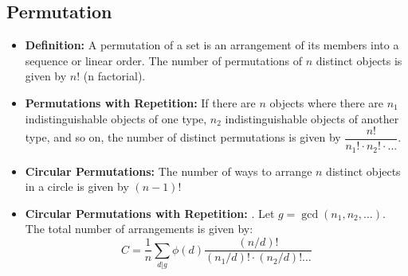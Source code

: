 \subsection{Permutation}

\begin{itemize}
    \item \textbf{Definition: } A permutation of a set is an arrangement of its members into a sequence or linear order. The number of permutations of $n$ distinct objects is given by $n!$ (n factorial).
    \item \textbf{Permutations with Repetition: } If there are $n$ objects where there are $n_1$ indistinguishable objects of one type, $n_2$ indistinguishable objects of another type, and so on, the number of distinct permutations is given by $\dfrac{n!}{n_1! \cdot n_2! \cdot ...}$.
    \item \textbf{Circular Permutations: } The number of ways to arrange $n$ distinct objects in a circle is given by $(n-1)!$
    \item \textbf{Circular Permutations with Repetition: } . Let $g = \gcd(n_1, n_2, \dots)$. The total number of arrangements is given by:
    $$ C = \frac{1}{n} \sum_{d|g} \phi(d) \frac{(n/d)!}{(n_1/d)! \cdot (n_2/d)! \dots} $$
\end{itemize}